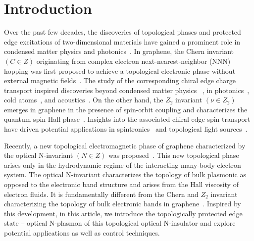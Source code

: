 \documentclass[%
reprint,
amsmath,amssymb,
aps,superscriptaddress
]{revtex4-2}
\begin{document}
\maketitle

\section{Introduction}\label{section1}
Over the past few decades, the discoveries of topological phases and protected edge excitations of two-dimensional materials have gained a prominent role in condensed matter physics and photonics~\cite{bernevig2006quantum,rechtsman2013photonic,lu2014topological}. In graphene, the Chern invariant $(C \in Z)$ originating from complex electron next-nearest-neighbor (NNN) hopping was first proposed to achieve a topological electronic phase without external magnetic fields~\cite{haldane1988model}. The study of the corresponding chiral edge charge transport inspired discoveries beyond condensed matter physics ~\cite{hao2008topological}, in photonics~\cite{hafezi2013imaging,poo2011experimental}, cold atoms~\cite{jotzu2014experimental}, and acoustics~\cite{yang2015topological}. On the other hand, the $Z_2$ invariant $(\nu \in Z_2)$ emerges in graphene in the presence of spin-orbit coupling and characterizes the quantum spin Hall phase~\cite{kane2005quantum}. Insights into the associated chiral edge spin transport have driven potential applications in spintronics~\cite{konig2008quantum,brune2012spin,han2018quantum} and topological light sources~\cite{harari2018topological,xie2020higher}. 

Recently, a new topological electromagnetic phase of graphene characterized by the optical N-invariant $(N \in Z)$ was proposed~\cite{van2021optical,van2022optical}. This new topological phase arises only in the hydrodynamic regime of the interacting many-body electron system. The optical N-invariant characterizes the topology of bulk plasmonic  as opposed to the electronic band structure and arises from the Hall viscosity of electron fluids. It is fundamentally different from the Chern and $Z_2$ invariant characterizing the topology of bulk electronic bands in graphene~\cite{van2021optical}. Inspired by this development, in this article, we introduce the topologically protected edge state -- optical N-plasmon of this topological optical N-insulator and explore potential applications as well as control techniques.
\end{document}
